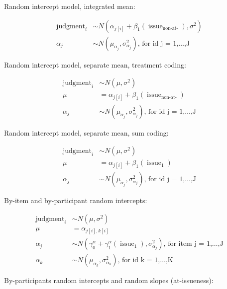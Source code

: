 \documentclass{article}
\begin{document}
Random intercept model, integrated mean:

$$
\begin{aligned}
  \operatorname{judgment}_{i}  &\sim N \left(\alpha_{j[i]} + \beta_{1}(\operatorname{issue}_{\operatorname{non-at-}}), \sigma^2 \right) \\
    \alpha_{j}  &\sim N \left(\mu_{\alpha_{j}}, \sigma^2_{\alpha_{j}} \right)
    \text{, for id j = 1,} \dots \text{,J}
\end{aligned}
$$

Random intercept model, separate mean, treatment coding:

$$
\begin{aligned}
  \operatorname{judgment}_{i}  &\sim N \left(\mu, \sigma^2 \right) \\
    \mu &=\alpha_{j[i]} + \beta_{1}(\operatorname{issue}_{\operatorname{non-at-}}) \\
    \alpha_{j}  &\sim N \left(\mu_{\alpha_{j}}, \sigma^2_{\alpha_{j}} \right)
    \text{, for id j = 1,} \dots \text{,J}
\end{aligned}
$$

Random intercept model, separate mean, sum coding:

$$
\begin{aligned}
  \operatorname{judgment}_{i}  &\sim N \left(\mu, \sigma^2 \right) \\
    \mu &=\alpha_{j[i]} + \beta_{1}(\operatorname{issue}_{\operatorname{1}}) \\
    \alpha_{j}  &\sim N \left(\mu_{\alpha_{j}}, \sigma^2_{\alpha_{j}} \right)
    \text{, for id j = 1,} \dots \text{,J}
\end{aligned}
$$

By-item and by-participant random intercepts:

$$
\begin{aligned}
  \operatorname{judgment}_{i}  &\sim N \left(\mu, \sigma^2 \right) \\
    \mu &=\alpha_{j[i],k[i]} \\
    \alpha_{j}  &\sim N \left(\gamma_{0}^{\alpha} + \gamma_{1}^{\alpha}(\operatorname{issue}_{\operatorname{1}}), \sigma^2_{\alpha_{j}} \right)
    \text{, for item j = 1,} \dots \text{,J} \\
    \alpha_{k}  &\sim N \left(\mu_{\alpha_{k}}, \sigma^2_{\alpha_{k}} \right)
    \text{, for id k = 1,} \dots \text{,K}
\end{aligned}
$$


By-participants random intercepts and random slopes (at-issueness):
\end{document}
